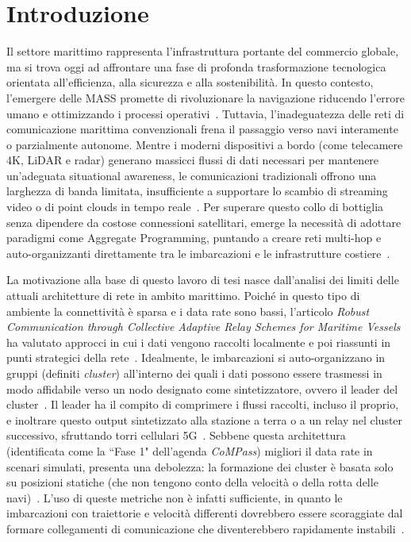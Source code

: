 \chapter{Introduzione}
\label{chap:introduzione}

Il settore marittimo rappresenta l'infrastruttura portante del commercio globale, ma si trova oggi ad affrontare una fase di profonda trasformazione tecnologica orientata all'efficienza, alla sicurezza e alla sostenibilità. In questo contesto, l'emergere delle \ac{MASS} promette di rivoluzionare la navigazione riducendo l'errore umano e ottimizzando i processi operativi~\cite{11217861, roadmap}. Tuttavia, l'inadeguatezza delle reti di comunicazione marittima convenzionali frena il passaggio verso navi interamente o parzialmente autonome. Mentre i moderni dispositivi a bordo (come telecamere 4K, \ac{LiDAR} e radar) generano massicci flussi di dati necessari per mantenere un'adeguata situational awareness, le comunicazioni tradizionali offrono una larghezza di banda limitata, insufficiente a supportare lo scambio di streaming video o di point clouds in tempo reale~\cite{11217861, 10.1145/2664243.2664257}. Per superare questo collo di bottiglia senza dipendere da costose connessioni satellitari, emerge la necessità di adottare paradigmi come Aggregate Programming, puntando a creare reti multi-hop e auto-organizzanti direttamente tra le imbarcazioni e le infrastrutture costiere~\cite{beal2015aggregate, casadei2019self}. 

La motivazione alla base di questo lavoro di tesi nasce dall'analisi dei limiti delle attuali architetture di rete in ambito marittimo. Poiché in questo tipo di ambiente la connettività è sparsa e i data rate sono bassi, l'articolo \emph{Robust Communication through Collective Adaptive Relay Schemes for Maritime Vessels} ha valutato approcci in cui i dati vengono raccolti localmente e poi riassunti in punti strategici della rete~\cite{11217861}. Idealmente, le imbarcazioni si auto-organizzano in gruppi (definiti \emph{cluster}) all'interno dei quali i dati possono essere trasmessi in modo affidabile verso un nodo designato come sintetizzatore, ovvero il leader del cluster~\cite{11217861}. Il leader ha il compito di comprimere i flussi raccolti, incluso il proprio, e inoltrare questo output sintetizzato alla stazione a terra o a un relay nel cluster successivo, sfruttando torri cellulari 5G~\cite{11217861}. Sebbene questa architettura (identificata come la ``Fase 1" dell'agenda \emph{CoMPass}) migliori il data rate in scenari simulati, presenta una debolezza: la formazione dei cluster è basata solo su posizioni statiche (che non tengono conto della velocità o della rotta delle navi)~\cite{11217861, roadmap}. L'uso di queste metriche non è infatti sufficiente, in quanto le imbarcazioni con traiettorie e velocità differenti dovrebbero essere scoraggiate dal formare collegamenti di comunicazione che diventerebbero rapidamente instabili~\cite{roadmap}. 

